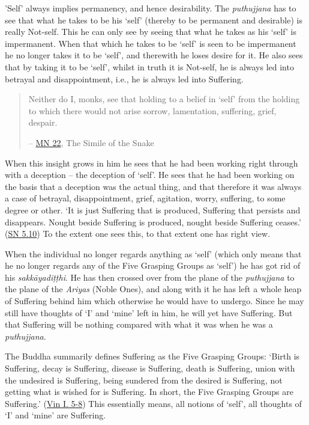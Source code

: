\protect\hypertarget{impermanent}{}{}'Self' always implies permanency, and hence desirability. The \emph{puthujjana} has to see that what he takes to be his `self' (thereby to be permanent and desirable) is really Not-self. This he can only see by seeing that what he takes as his `self' is impermanent. When that which he takes to be `self' is seen to be impermanent he no longer takes it to be `self', and therewith he loses desire for it. He also sees that by taking it to be `self', whilst in truth it is Not-self, he is always led into betrayal and disappointment, i.e., he is always led into Suffering.

\enlargethispage{\baselineskip}

\begin{quote}
Neither do I, monks, see that holding to a belief in `self' from the holding to which there would not arise sorrow, lamentation, suffering, grief, despair.

 -- \href{https://suttacentral.net/mn22/en/bodhi}{MN 22}, The Simile of the Snake
\end{quote}

When this insight grows in him he sees that he had been working right through with a deception -- the deception of `self'. He sees that he had been working on the basis that a deception was the actual thing, and that therefore it was always a case of betrayal, disappointment, grief, agitation, worry, suffering, to some degree or other. `It is just Suffering that is produced, Suffering that persists and disappears. Nought beside Suffering is produced, nought beside Suffering ceases.' (\href{https://suttacentral.net/sn5.10/en/bodhi}{SN 5.10}) To the extent one sees this, to that extent one has right view.

When the individual no longer regards anything as `self' (which only means that he no longer regards any of the Five Grasping Groups as `self') he has got rid of his \emph{sakkāyadiṭṭhi}. He has then crossed over from the plane of the \emph{puthujjana} to the plane of the \emph{Ariyas} (Noble Ones), and along with it he has left a whole heap of Suffering behind him which otherwise he would have to undergo. Since he may still have thoughts of `I' and `mine' left in him, he will yet have Suffering. But that Suffering will be nothing compared with what it was when he was a \emph{puthujjana}.

The Buddha summarily defines Suffering as the Five Grasping Groups: `Birth is Suffering, decay is Suffering, disease is Suffering, death is Suffering, union with the undesired is Suffering, being sundered from the desired is Suffering, not getting what is wished for is Suffering. In short, the Five Grasping Groups are Suffering.' (\href{https://suttacentral.net/pli-tv-kd1/en/brahmali}{Vin I. 5-8}) This essentially means, all notions of `self', all thoughts of `I' and `mine' are Suffering.

